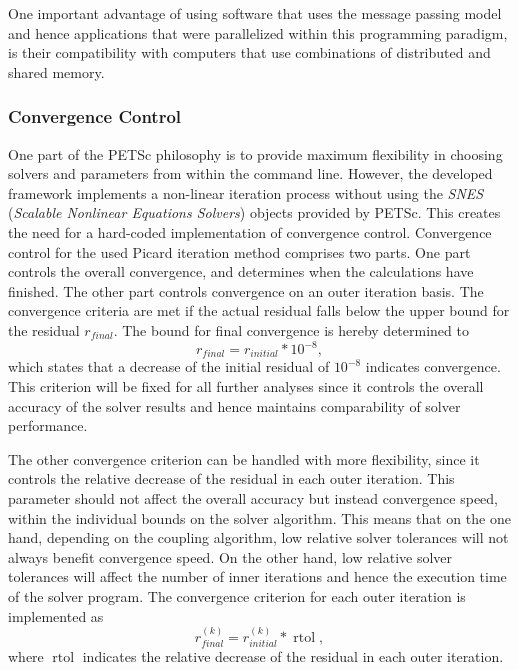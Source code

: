 One important advantage of using software that uses the message passing model and hence applications that were parallelized within this programming paradigm, is their compatibility with computers that use combinations of distributed and shared memory.

\subsubsection{Convergence Control} 
\label{sec:convergence}
One part of the PETSc philosophy is to provide maximum flexibility in choosing solvers and parameters from within the command line. However, the developed framework implements a non-linear iteration process without using the \emph{SNES} (\emph{Scalable Nonlinear Equations Solvers}) objects provided by PETSc. This creates the need for a hard-coded implementation of convergence control. Convergence control for the used Picard iteration method comprises two parts. One part controls the overall convergence, and determines when the calculations have finished. The other part controls convergence on an outer iteration basis. The convergence criteria are met if the actual residual falls below the upper bound for the residual \(r_{final}\). The bound for final convergence is hereby determined to
\begin{displaymath}
  r_{final} = r_{initial} * 10^{-8},
\end{displaymath}
which states that a decrease of the initial residual of \(10^{-8}\) indicates convergence. This criterion will be fixed for all further analyses since it controls the overall accuracy of the solver results and hence maintains comparability of solver performance. 

The other convergence criterion can be handled with more flexibility, since it controls the relative decrease of the residual in each outer iteration. This parameter should not affect the overall accuracy but instead convergence speed, within the individual bounds on the solver algorithm. This means that on the one hand, depending on the coupling algorithm, low relative solver tolerances will not always benefit convergence speed. On the other hand, low relative solver tolerances will affect the number of inner iterations and hence the execution time of the solver program. The convergence criterion for each outer iteration is implemented as
\begin{displaymath}
  r_{final}^{(k)} = r_{initial}^{(k)} * \operatorname{rtol},
\end{displaymath}
where \(\operatorname{rtol}\) indicates the relative decrease of the residual in each outer iteration. 

